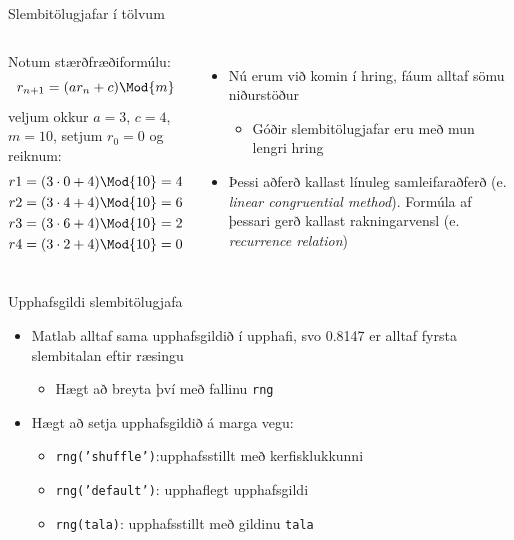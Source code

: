 \documentclass[handout]{beamer}
\begin{document}
\begin{frame}{Slembitölugjafar í tölvum}
\begin{columns}
Notum stærðfræðiformúlu:
\[
r_{n+1} = (ar_n + c) \Mod{m}
\]
veljum okkur $a=3$, $c=4$, $m=10$, setjum $r_0 = 0$ og reiknum:
\begin{align*}
r1 = (3 \cdot 0 + 4) \Mod{10}  &=  4\\
r2 = (3 \cdot 4 + 4) \Mod{10}  &=  6\\
r3 = (3 \cdot 6 + 4) \Mod{10}  &=  2\\
r4 = (3 \cdot 2 + 4) \Mod{10}  &=  0\\
\end{align*}
\begin{itemize}
\item Nú erum við komin í hring, fáum alltaf sömu niðurstöður
 \begin{itemize}
  \item Góðir slembitölugjafar eru með mun lengri hring
 \end{itemize}
 \item Þessi aðferð kallast línuleg samleifaraðferð (e. \emph{linear congruential method}). Formúla af þessari gerð kallast rakningarvensl (e. \emph{recurrence relation})
\end{itemize}
\end{columns}
\end{frame}

\begin{frame}{Upphafsgildi slembitölugjafa}
\begin{itemize}
 \item Matlab alltaf sama upphafsgildið í upphafi, svo 0.8147 er alltaf fyrsta slembitalan eftir ræsingu
 \begin{itemize}
  \item Hægt að breyta því með fallinu \texttt{rng}
 \end{itemize}
 \item Hægt að setja upphafsgildið á marga vegu:
 \begin{itemize}
  \item \texttt{rng('shuffle')}:upphafsstillt með kerfisklukkunni
  \item \texttt{rng('default')}: upphaflegt upphafsgildi
  \item \texttt{rng(tala)}: upphafsstillt með gildinu \texttt{tala}
 \end{itemize}
\end{itemize}
\end{frame}
\end{document}
